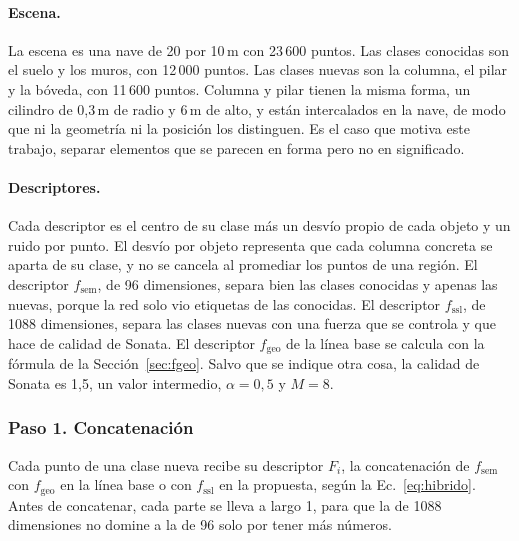 \paragraph*{Escena.}
La escena es una nave de 20 por 10\,m con 23\,600 puntos. Las clases conocidas
son el suelo y los muros, con 12\,000 puntos. Las clases nuevas son la columna,
el pilar y la bóveda, con 11\,600 puntos. Columna y pilar tienen la misma forma,
un cilindro de 0{,}3\,m de radio y 6\,m de alto, y están intercalados en la nave,
de modo que ni la geometría ni la posición los distinguen. Es el caso que motiva
este trabajo, separar elementos que se parecen en forma pero no en significado.

\paragraph*{Descriptores.}
Cada descriptor es el centro de su clase más un desvío propio de cada objeto y
un ruido por punto. El desvío por objeto representa que cada columna concreta se
aparta de su clase, y no se cancela al promediar los puntos de una región. El
descriptor $f_{\mathrm{sem}}$, de 96 dimensiones, separa bien las clases
conocidas y apenas las nuevas, porque la red solo vio etiquetas de las conocidas.
El descriptor $f_{\mathrm{ssl}}$, de 1088 dimensiones, separa las clases nuevas
con una fuerza que se controla y que hace de calidad de Sonata. El descriptor
$f_{\mathrm{geo}}$ de la línea base se calcula con la fórmula de la
Sección~\ref{sec:fgeo}. Salvo que se indique otra cosa, la calidad de Sonata es
1{,}5, un valor intermedio, $\alpha=0{,}5$ y $M=8$.

\subsubsection*{Paso 1. Concatenación}

Cada punto de una clase nueva recibe su descriptor $F_i$, la concatenación de
$f_{\mathrm{sem}}$ con $f_{\mathrm{geo}}$ en la línea base o con
$f_{\mathrm{ssl}}$ en la propuesta, según la Ec.~\eqref{eq:hibrido}. Antes de
concatenar, cada parte se lleva a largo 1, para que la de 1088 dimensiones no
domine a la de 96 solo por tener más números.

\begin{algorithm}[H]
\small
\caption{Paso 1 del Módulo~4, concatenación.}
\end{algorithm}

